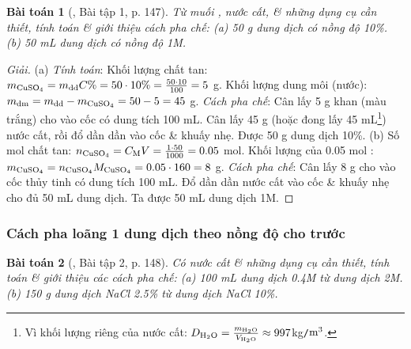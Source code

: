 \documentclass{article}
\newtheorem{baitoan}{Bài toán}
\begin{document}
\begin{baitoan}[\cite{SGK_Hoa_Hoc_8}, Bài tập 1, p. 147]
	Từ muối \emph{}, nước cất, \& những dụng cụ cần thiết, tính toán \& giới thiệu cách pha chế: (a) \emph{50 g} dung dịch \emph{} có nồng độ \emph{10\%}. (b) \emph{50 mL} dung dịch \emph{} có nồng độ \emph{1M}.
\end{baitoan}

\begin{proof}[Giải]
	(a) \textit{Tính toán}: Khối lượng chất tan: $m_{\ce{CuSO4}} = m_{\rm dd}C\% = 50\cdot10\% = \frac{50\cdot10}{100} = 5$ g. Khối lượng dung môi (nước): $m_{\rm dm} = m_{\rm dd} - m_{\ce{CuSO4}} = 50 - 5 = 45$ g. \textit{Cách pha chế}: Cân lấy 5 g  khan (màu trắng) cho vào cốc có dung tích 100 mL. Cân lấy 45 g (hoặc đong lấy 45 mL\footnote{Vì khối lượng riêng của nước cất: $D_{\ce{H2O}} = \frac{m_{\ce{H2O}}}{V_{\ce{H2O}}}\approx997$kg\texttt{/}$\rm m^3$.}) nước cất, rồi đổ dần dần vào cốc \& khuấy nhẹ. Được 50 g dung dịch  10\%. (b) Số mol chất tan: $n_{\ce{CuSO4}} = C_{\rm M}V = \frac{1\cdot50}{1000} = 0.05$ mol. Khối lượng của 0.05 mol : $m_{\ce{CuSO4}} = n_{\ce{CuSO4}}M_{\ce{CuSO4}} = 0.05\cdot160 = 8$ g. \textit{Cách pha chế}: Cân lấy 8 g  cho vào cốc thủy tinh có dung tích 100 mL. Đổ dần dần nước cất vào cốc \& khuấy nhẹ cho đủ 50 mL dung dịch. Ta được 50 mL dung dịch  1M.
\end{proof}

\subsubsection{Cách pha loãng 1 dung dịch theo nồng độ cho trước}

\begin{baitoan}[\cite{SGK_Hoa_Hoc_8}, Bài tập 2, p. 148]
	Có nước cất \& những dụng cụ cần thiết, tính toán \& giới thiệu các cách pha chế: (a) \emph{100 mL} dung dịch \emph{ 0.4M} từ dung dịch \emph{ 2M}. (b) \emph{150 g} dung dịch \emph{NaCl 2.5\%} từ dung dịch \emph{NaCl 10\%}.
\end{baitoan}
\end{document}
